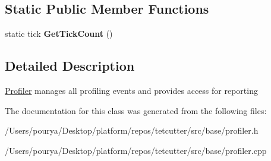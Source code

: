 \subsection*{Static Public Member Functions}
\begin{DoxyCompactItemize}
\item 
\hypertarget{classps_1_1utils_1_1Profiler_a34463bcef60575ea0fcb282f9a02c7a0}{}static tick {\bfseries Get\+Tick\+Count} ()\label{classps_1_1utils_1_1Profiler_a34463bcef60575ea0fcb282f9a02c7a0}

\end{DoxyCompactItemize}


\subsection{Detailed Description}
\hyperlink{classps_1_1utils_1_1Profiler}{Profiler} manages all profiling events and provides access for reporting 

The documentation for this class was generated from the following files\+:\begin{DoxyCompactItemize}
\item 
/\+Users/pourya/\+Desktop/platform/repos/tetcutter/src/base/profiler.\+h\item 
/\+Users/pourya/\+Desktop/platform/repos/tetcutter/src/base/profiler.\+cpp\end{DoxyCompactItemize}
